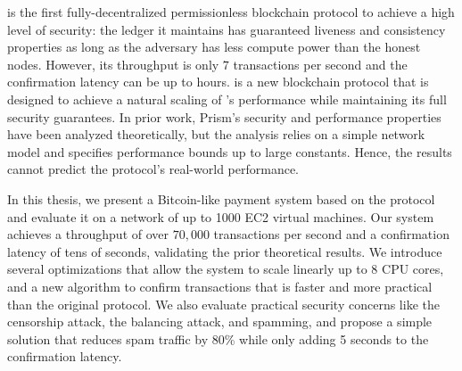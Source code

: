 % 
% 
%
\bitcoin is the first fully-decentralized permissionless blockchain protocol to achieve a high level of security: the ledger it maintains has guaranteed liveness and consistency properties as long as the adversary has less compute power than the honest nodes. However, its throughput is only $7$ transactions per second and the confirmation latency can be up to hours. \prism is a new blockchain protocol that is designed to achieve a natural scaling of \bitcoin's performance while maintaining its full security guarantees. In prior work, Prism's security and performance properties have been analyzed theoretically, but the analysis relies on a simple network model and specifies performance bounds up to large constants. Hence, the results cannot predict the protocol's real-world performance. 

In this thesis, we present a Bitcoin-like payment system based on the \prism protocol and evaluate it on a network of up to 1000 EC2 virtual machines. Our system achieves a throughput of over $70,000$ transactions per second and a confirmation latency of tens of seconds, validating the prior theoretical results. We introduce several optimizations that allow the system to scale linearly up to 8 CPU cores, and a new algorithm to confirm transactions that is faster and more practical than the original protocol. We also evaluate practical security concerns like the censorship attack, the balancing attack, and spamming, and propose a simple solution that reduces spam traffic by 80\% while only adding 5 seconds to the confirmation latency.
